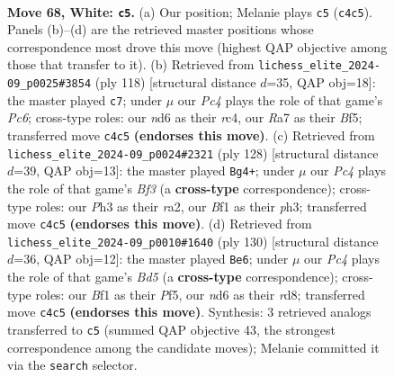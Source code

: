 \documentclass[11pt]{article}
\begin{document}
\clearpage

\begin{figure}[p]\centering
\begin{subfigure}{0.46\textwidth}\centering
\resizebox{\linewidth}{!}{%
\newchessgame
\chessboard[
  setfen={3k1r2/R6p/P2n4/8/2P5/2p4P/2P1K1P1/5B2 w - - 5 68},
  showmover=false,
  pgfstyle=straightmove, color=movearrow, markmove={c4-c5}
]}
\caption{}
\end{subfigure}\hfill
\begin{subfigure}{0.46\textwidth}\centering
\resizebox{\linewidth}{!}{%
\newchessgame
\chessboard[
  setfen={8/p3k3/2P5/5B2/1br3p1/6P1/7P/1R5K w - - 2 60},
  showmover=false,
  pgfstyle=straightmove, color=movearrow, markmove={c6-c7}
]}
\caption{}
\end{subfigure}
\\[4pt]
\begin{subfigure}{0.46\textwidth}\centering
\resizebox{\linewidth}{!}{%
\newchessgame
\chessboard[
  setfen={8/8/3p4/1P1P1kn1/2P4R/5B1p/r7/5K2 w - - 6 65},
  showmover=false,
  pgfstyle=straightmove, color=movearrow, markmove={f3-g4}
]}
\caption{}
\end{subfigure}\hfill
\begin{subfigure}{0.46\textwidth}\centering
\resizebox{\linewidth}{!}{%
\newchessgame
\chessboard[
  setfen={3r1k2/1R6/1P3K1p/3B1P2/8/7P/6P1/8 w - - 3 66},
  showmover=false,
  pgfstyle=straightmove, color=movearrow, markmove={d5-e6}
]}
\caption{}
\end{subfigure}
\caption{\textbf{Move 68, White: \texttt{c5}.} (a) Our position; Melanie plays \texttt{c5} (\texttt{c4c5}). Panels (b)--(d) are the retrieved master positions whose correspondence most drove this move (highest QAP objective among those that transfer to it). (b) Retrieved from \texttt{lichess\_elite\_2024-09\_p0025\#3854} (ply 118) [structural distance $d$=35, QAP obj=18]: the master played \texttt{c7}; under $\mu$ our \emph{Pc4} plays the role of that game's \emph{Pc6}; cross-type roles: our \emph{n}d6 as their \emph{r}c4, our \emph{R}a7 as their \emph{B}f5; transferred move \texttt{c4c5} \textbf{(endorses this move)}. (c) Retrieved from \texttt{lichess\_elite\_2024-09\_p0024\#2321} (ply 128) [structural distance $d$=39, QAP obj=13]: the master played \texttt{Bg4+}; under $\mu$ our \emph{Pc4} plays the role of that game's \emph{Bf3} (a \textbf{cross-type} correspondence); cross-type roles: our \emph{P}h3 as their \emph{r}a2, our \emph{B}f1 as their \emph{p}h3; transferred move \texttt{c4c5} \textbf{(endorses this move)}. (d) Retrieved from \texttt{lichess\_elite\_2024-09\_p0010\#1640} (ply 130) [structural distance $d$=36, QAP obj=12]: the master played \texttt{Be6}; under $\mu$ our \emph{Pc4} plays the role of that game's \emph{Bd5} (a \textbf{cross-type} correspondence); cross-type roles: our \emph{B}f1 as their \emph{P}f5, our \emph{n}d6 as their \emph{r}d8; transferred move \texttt{c4c5} \textbf{(endorses this move)}. Synthesis: 3 retrieved analogs transferred to \texttt{c5} (summed QAP objective 43, the strongest correspondence among the candidate moves); Melanie committed it via the \texttt{search} selector.}
\label{fig:thought-m134}
\end{figure}
\end{document}
